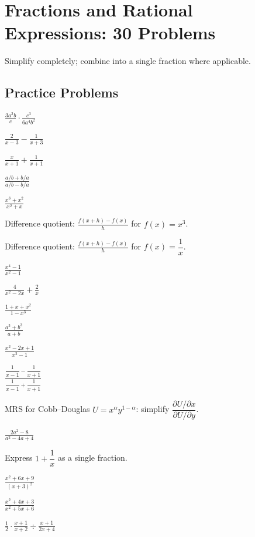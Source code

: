 \chapter{Fractions and Rational Expressions: 30 Problems}

Simplify completely; combine into a single fraction where applicable.

\section{Practice Problems}

\begin{problems}
  \item $\displaystyle\frac{3a^{2}b}{c}\cdot\frac{c^{3}}{6a^{4}b^{2}}$
  \item $\displaystyle\frac{2}{x-3}-\frac{1}{x+3}$
  \item $\displaystyle\frac{x}{x+1}+\frac{1}{x+1}$
  \item $\displaystyle\frac{a/b+b/a}{a/b-b/a}$
  \item $\displaystyle\frac{x^{3}+x^{2}}{x^{2}+x}$
  \item Difference quotient: $\displaystyle\frac{f(x+h)-f(x)}{h}$
        for $f(x)=x^{3}$.
  \item Difference quotient: $\displaystyle\frac{f(x+h)-f(x)}{h}$
        for $f(x)=\dfrac{1}{x}$.
  \item $\displaystyle\frac{x^{4}-1}{x^{2}-1}$
  \item $\displaystyle\frac{4}{x^{2}-2x}+\frac{2}{x}$
  \item $\displaystyle\frac{1+x+x^{2}}{1-x^{3}}$
  \item $\displaystyle\frac{a^{3}+b^{3}}{a+b}$
  \item $\displaystyle\frac{x^{2}-2x+1}{x^{2}-1}$
  \item $\displaystyle\frac{\dfrac{1}{x-1}-\dfrac{1}{x+1}}
        {\dfrac{1}{x-1}+\dfrac{1}{x+1}}$
  \item MRS for Cobb--Douglas $U=x^{\alpha}y^{1-\alpha}$: simplify
        $\dfrac{\partial U/\partial x}{\partial U/\partial y}$.
  \item $\displaystyle\frac{2a^{2}-8}{a^{2}-4a+4}$
  \item Express $1+\dfrac{1}{x}$ as a single fraction.
  \item $\displaystyle\frac{x^{2}+6x+9}{(x+3)^{2}}$
  \item $\displaystyle\frac{x^{2}+4x+3}{x^{2}+5x+6}$
  \item $\displaystyle\frac{1}{2}\cdot\frac{x+1}{x+2}\div\frac{x+1}{2x+4}$

\end{problems}
